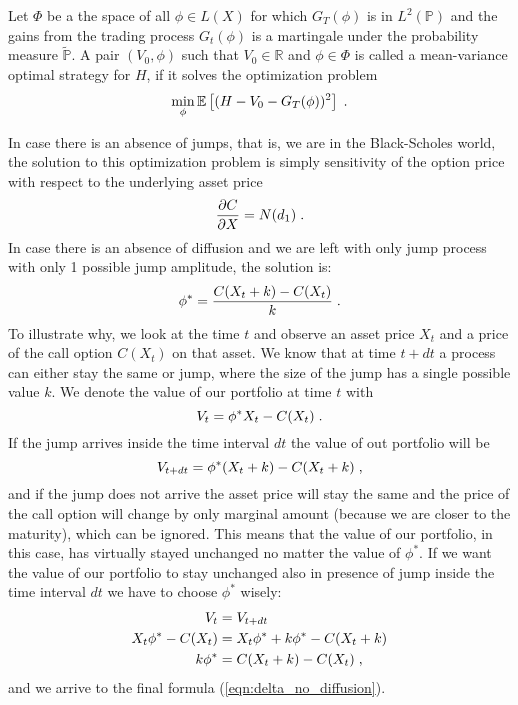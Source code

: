 \documentclass[times, utf8, diplomski]{fer}
\begin{document}
\begin{definition} \label{def:mean_variance_hedge}
	Let $\Phi$ be a the space of all $\phi \in L(X)$ for which $G_T(\phi)$ is in $L^2(\mathbb{P})$ and the gains from the trading process $G_t(\phi)$ is a martingale under the probability measure $\tilde{\mathbb{P}}$. A pair $(V_0, \phi)$ such that $V_0 \in \mathbb{R}$ and $\phi \in \Phi$ is called a mean-variance optimal strategy for $H$, if it solves the optimization problem 
	\begin{equation} \label{eqn:min_hedge_error}
		\min_{\phi}\mathbb{E}\left[ (H - V_0 - G_T(\phi))^2 \right] \hspace{0.1cm}.
	\end{equation}
\end{definition}
\noindent In case there is an absence of jumps, that is, we are in the Black-Scholes world, the solution to this optimization problem is simply sensitivity of the option price with respect to the underlying asset price
\begin{equation*}
	\frac{\partial C}{\partial X} = N(d_1) \hspace{0.1cm}.
\end{equation*}
In case there is an absence of diffusion and we are left with only jump process with only 1 possible jump amplitude, the solution is:
\begin{equation} \label{eqn:delta_no_diffusion}
	\phi^* = \frac{C(X_t + k) - C(X_t)}{k} \hspace{0.1cm}.
\end{equation}
To illustrate why, we look at the time $t$ and observe an asset price $X_t$ and a price of the call option $C(X_t)$ on that asset. We know that at time $t+dt$ a process can either stay the same or jump, where the size of the jump has a single possible value $k$. We denote the value of our portfolio at time $t$ with $$V_t = \phi^* X_t - C(X_t) \hspace{0.1cm}.$$ If the jump arrives inside the time interval $dt$ the value of out portfolio will be
$$V_{t+dt} = \phi^* (X_t + k) - C(X_t + k) \hspace{0.1cm},$$
and if the jump does not arrive the asset price will stay the same and the price of the call option will change by only marginal amount (because we are closer to the maturity), which can be ignored. This means that the value of our portfolio, in this case, has virtually stayed unchanged no matter the value of $\phi^*$. If we want the value of our portfolio to stay unchanged also in presence of jump inside the time interval $dt$ we have to choose $\phi^*$ wisely:
\begin{align*}
	V_t &= V_{t+dt} \\
	X_t\phi^* - C(X_t) &=  X_t\phi^*+ k\phi^* - C(X_t + k) \\
	k\phi^* &= C(X_t + k) - C(X_t) \hspace{0.1cm},
\end{align*} and we arrive to the final formula (\ref{eqn:delta_no_diffusion}).
\end{document}
